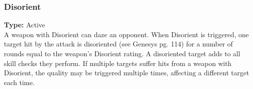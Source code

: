 \subsubsection{Disorient}
\label{iqty:disorient}
\textbf{Type:} Active\\
A weapon with Disorient can daze an opponent. When
Disorient is triggered, one target hit by the attack is
disoriented (see Genesys pg. 114) for a number of rounds equal
to the weapon’s Disorient rating. A disoriented target
adds \setback to all skill checks they perform. If
multiple targets suffer hits from a weapon with Disorient,
the quality may be triggered multiple times, affecting a
different target each time.
